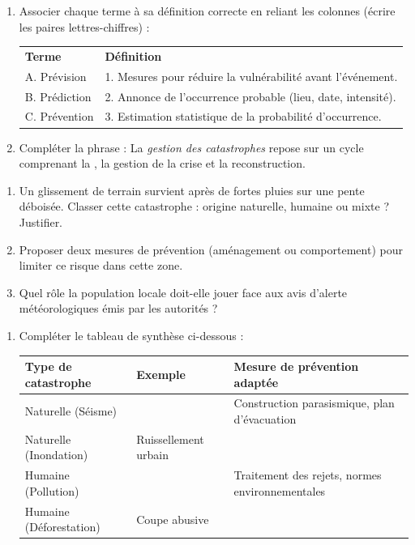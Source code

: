 \documentclass[11pt]{article}
\begin{document}
\begin{exercice}
\begin{enumerate}
    \item Associer chaque terme à sa définition correcte en reliant les colonnes (écrire les paires lettres-chiffres) :
    \begin{tabular}{ll}
    \textbf{Terme} & \textbf{Définition} \\
    A. Prévision & 1. Mesures pour réduire la vulnérabilité avant l'événement. \\
    B. Prédiction & 2. Annonce de l'occurrence probable (lieu, date, intensité). \\
    C. Prévention & 3. Estimation statistique de la probabilité d'occurrence. \\
    \end{tabular}
    \item Compléter la phrase : La \textit{gestion des catastrophes} repose sur un cycle comprenant la \underline{\hspace{4cm}}, la gestion de la crise et la reconstruction.
\end{enumerate}
\end{exercice}

\begin{exercice}
\begin{enumerate}
    \item Un glissement de terrain survient après de fortes pluies sur une pente déboisée. Classer cette catastrophe : origine naturelle, humaine ou mixte ? Justifier.
    \item Proposer deux mesures de prévention (aménagement ou comportement) pour limiter ce risque dans cette zone.
    \item Quel rôle la population locale doit-elle jouer face aux avis d'alerte météorologiques émis par les autorités ?
\end{enumerate}
\end{exercice}

\begin{exercice}
\begin{enumerate}
    \item Compléter le tableau de synthèse ci-dessous :
    \begin{tabular}{|p{3cm}|p{5cm}|p{5cm}|}
    \hline
    \textbf{Type de catastrophe} & \textbf{Exemple} & \textbf{Mesure de prévention adaptée} \\
    \hline
    Naturelle (Séisme) & & Construction parasismique, plan d'évacuation \\
    \hline
    Naturelle (Inondation) & Ruissellement urbain & \\
    \hline
    Humaine (Pollution) & & Traitement des rejets, normes environnementales \\
    \hline
    Humaine (Déforestation) & Coupe abusive & \\
    \hline
    \end{tabular}
\end{enumerate}
\end{exercice}
\end{document}
